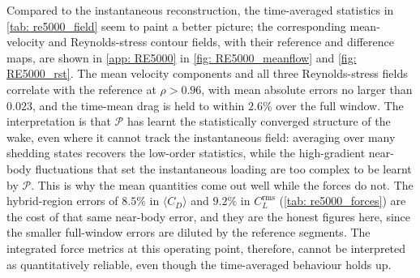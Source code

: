Compared to the instantaneous reconstruction, the time-averaged statistics in \autoref{tab: re5000_field} seem to paint a better picture; the corresponding mean-velocity and Reynolds-stress contour fields, with their reference and difference maps, are shown in \autoref{app: RE5000} in \autoref{fig: RE5000_meanflow} and \autoref{fig: RE5000_rst}. The mean velocity components and all three Reynolds-stress fields correlate with the reference at $\rho>0.96$, with mean absolute errors no larger than $0.023$, and the time-mean drag is held to within $2.6\%$ over the full window. The interpretation is that $\mathcal{P}$ has learnt the statistically converged structure of the wake, even where it cannot track the instantaneous field: averaging over many shedding states recovers the low-order statistics, while the high-gradient near-body fluctuations that set the instantaneous loading are too complex to be learnt by $\mathcal{P}$. This is why the mean quantities come out well while the forces do not. The hybrid-region errors of $8.5\%$ in $\langle C_D\rangle$ and $9.2\%$ in $C_L^\text{rms}$ (\autoref{tab: re5000_forces}) are the cost of that same near-body error, and they are the honest figures here, since the smaller full-window errors are diluted by the reference segments. The integrated force metrics at this operating point, therefore, cannot be interpreted as quantitatively reliable, even though the time-averaged behaviour holds up.

